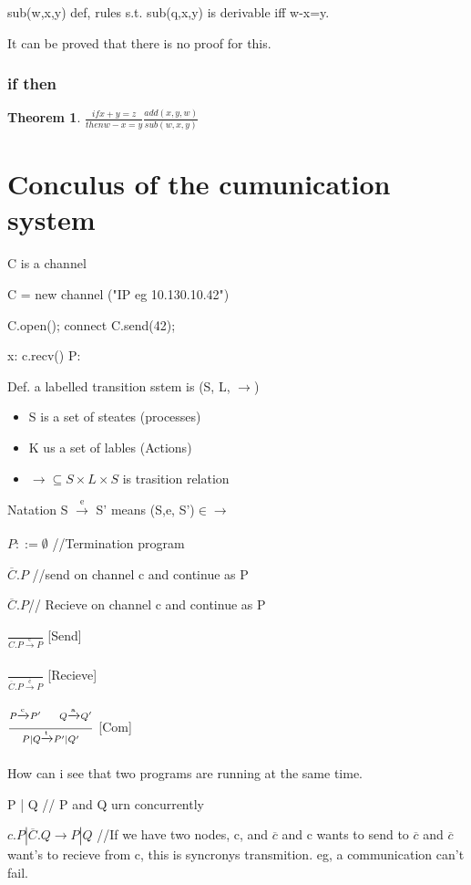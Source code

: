 \documentclass[a4paper,10pt,titlepage]{report}
\newtheorem{theorem}{Theorem}
\begin{document}
sub(w,x,y) def, rules s.t. sub(q,x,y) is derivable iff w-x=y.

It can be proved that there is no proof for this.



\subsubsection{if then}

\begin{theorem}

$\frac{if x+y=z}{then w-x=y}\frac{add(x,y,w)}{sub(w,x,y)}$

\end{theorem}

\newpage

\section{Conculus of the cumunication system}

C is a channel

C = new channel ("IP eg 10.130.10.42")

C.open(); connect
C.send(42);

x: c.recv()
P:


Def. a labelled transition sstem is (S, L, $\rightarrow$)
\begin{itemize}
\item S is a set of steates (processes)
\item K us a set of lables (Actions)
\item $\rightarrow \subseteq S\times L\times S $ is trasition relation 
\end{itemize}

Natation S $ \xrightarrow[\text{}]{\text{e}} $ S' means (S,e, S')$ \in \rightarrow$ 


$P::= \emptyset$ \hspace{20mm}//Termination program

$\overline{C}.P$ \hspace{24mm}//send on channel c and continue as P 

$\overline{C}.P $\hspace{25mm}// Recieve on channel c and continue as P 


$ \frac{}{C.P \xrightarrow[\text{}]{\text{c}}P}  $ [Send]

$ \frac{}{ \overline{C}.P \xrightarrow[\text{}]{\overline{ \text{c} }}P}  $ [Recieve]

$ \frac{P \xrightarrow[\text{}]{{ \text{c} }}P' \hspace{5mm} Q\xrightarrow[\text{}]{{ \text{a} }}Q'}{P|Q \xrightarrow[\text{}]{{ \text{t} }}P'| Q'}  $ [Com]




How can i see that two programs are running at the same time.

P | Q \hspace{21mm}// P and Q urn concurrently

$c.P | \overline{C}.Q \rightarrow P | Q$ \hspace{2mm} //If we have two nodes, c, and $\overline{c}$ and c wants to send to $\overline{c}$ and $\overline{c}$ want's to recieve from c, this is syncronys transmition. eg, a communication can't fail.
\end{document}
